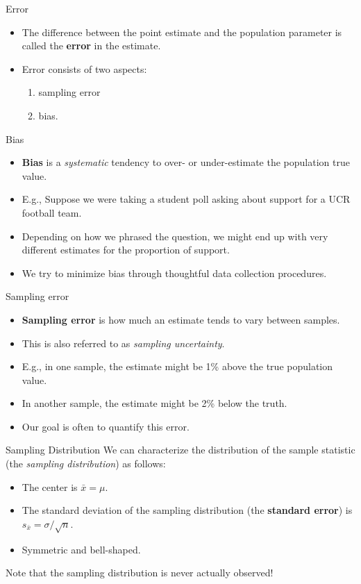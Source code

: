 \begin{frame}{Error}
    \begin{itemize}
        \item The difference between the point estimate and the population parameter is called the \textbf{error} in the estimate. 
        \item Error consists of two aspects: 
        \begin{enumerate}
            \item sampling error 
            \item bias.
        \end{enumerate}
    \end{itemize}
\end{frame}

\begin{frame}{Bias}
    \begin{itemize}
        \item \textbf{Bias} is a \textit{systematic} tendency to over- or under-estimate the population true value.
        \item E.g., Suppose we were taking a student poll asking about support for a UCR football team.
        \item Depending on how we phrased the question, we might end up with very different estimates for the proportion of support.
        \item We try to minimize bias through thoughtful data collection procedures.
    \end{itemize}
\end{frame}

\begin{frame}{Sampling error}
    \begin{itemize}
        \item \textbf{Sampling error} is how much an estimate tends to vary between samples.
        \item This is also referred to as \textit{sampling uncertainty}.
        \item E.g., in one sample, the estimate might be 1\% above the true population value. 
        \item In another sample, the estimate might be 2\% below the truth. 
        \item Our goal is often to quantify this error. 
    \end{itemize}
\end{frame}

\begin{frame}{Sampling Distribution}
    We can characterize the distribution of the sample statistic (the \textit{sampling distribution}) as follows:
    
    \begin{itemize}
        \item  The center is $\bar{x}=\mu$.
        \item The standard deviation of the sampling distribution (the \textbf{standard error}) is $s_{\bar{x}} = \sigma/\sqrt{n}$. 
        \item Symmetric and bell-shaped.
    \end{itemize}
    Note that the sampling distribution is never actually observed!
\end{frame}


